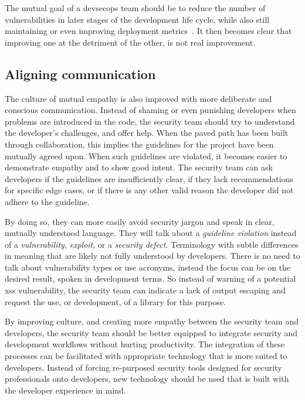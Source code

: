 The mutual goal of a \gls{devsecops} team should be to reduce the number of vulnerabilities in later stages of the development life cycle, while also still maintaining or even improving deployment metrics~\cite{doddevsecops}.
It then becomes clear that improving one at the detriment of the other, is not real improvement.

\subsection{Aligning communication}
\label{sec:communication}
The culture of mutual empathy is also improved with more deliberate and conscious communication.
Instead of shaming or even punishing developers when problems are introduced in the code, the security team should try to understand the developer's challenges, and offer help.
When the paved path has been built through collaboration, this implies the guidelines for the project have been mutually agreed upon.
When such guidelines are violated, it becomes easier to demonstrate empathy and to show good intent.
The security team can ask developers if the guidelines are insufficiently clear, if they lack recommendations for specific edge cases, or if there is any other valid reason the developer did not adhere to the guideline.

By doing so, they can more easily avoid security jargon and speak in clear, mutually understood language.
They will talk about a \textit{guideline violation} instead of a \textit{\gls{vulnerability}}, \textit{\gls{exploit}}, or a \textit{\gls{security defect}}.
Terminology with subtle differences in meaning that are likely not fully understood by developers.
There is no need to talk about \gls{vulnerability} types or use acronyms, instead the focus can be on the desired result, spoken in development terms.
So instead of warning of a potential \gls{xss} \gls{vulnerability}, the security team can indicate a lack of output escaping and request the use, or development, of a library for this purpose.

By improving culture, and creating more empathy between the security team and developers, the security team should be better equipped to integrate security and development workflows without hurting productivity.
The integration of these processes can be facilitated with appropriate technology that is more suited to developers.
Instead of forcing re-purposed security tools designed for security professionals onto developers, new technology should be used that is built with the developer experience in mind.

